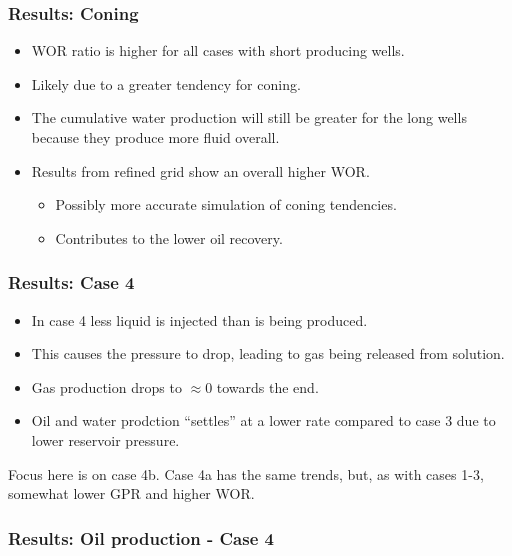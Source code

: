 \begin{frame}
    \frametitle{Results: Coning}
    \begin{itemize}
        \item WOR ratio is higher for all cases with short producing wells.
        \item Likely due to a greater tendency for coning.
        \item The cumulative water production will still be greater for the long wells because they produce more fluid overall.
        \pause
        \item Results from refined grid show an overall higher WOR.
        \begin{itemize}
            \item Possibly more accurate simulation of coning tendencies.
            \item Contributes to the lower oil recovery.
        \end{itemize}
    \end{itemize}
\end{frame}


\begin{frame}
    \frametitle{Results: Case 4}
    \begin{itemize}
        \item In case 4 less liquid is injected than is being produced.
        \pause
        \item This causes the pressure to drop, leading to gas being released from solution.
        \item Gas production drops to $\approx 0$ towards the end.
        \pause
        \item Oil and water prodction ``settles'' at a lower rate compared to case 3 due to lower reservoir pressure.
    \end{itemize}
    \pause
    \begin{remark}
        Focus here is on case 4b. Case 4a has the same trends, but, as with cases 1-3, somewhat lower GPR and higher WOR.
    \end{remark}
\end{frame}


\begin{frame}
    \frametitle{Results: Oil production - Case 4}
    \centerline{}
\end{frame}

